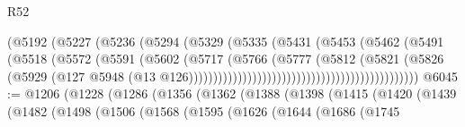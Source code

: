 \begin{lexlean}{R52}
\begin{coremodule}
{{{{{{{{{{{{{{{{{{{{{{{{{{{{{{{{{{{{{{{{{{{{{{{{{{{{{{{{{{{{{{{{{{{{{{{{{{{{{{{{{{{{{{{{{{{{{{{{{{{{{{{{{{{{{{{{{{{{{{{{{{{{{{{{{{{{{{{{{{{{{{{{{{{{{{{{{{{{{{{{{{{{{{{{{{{{{{{{{{{{{{{{{{{{{{{{{{{{{{                                                    (@5192
                                                      (@5227
                                                        (@5236
                                                          (@5294
                                                            (@5329
                                                              (@5335
                                                                (@5431
                                                                  (@5453
                                                                    (@5462
                                                                      (@5491
                                                                        (@5518
                                                                          (@5572
                                                                            (@5591
                                                                              (@5602
                                                                                (@5717
                                                                                  (@5766
                                                                                    (@5777
                                                                                      (@5812
                                                                                        (@5821
                                                                                          (@5826
                                                                                            (@5929
                                                                                              (@127
                                                                                                @5948
                                                                                                (@13
                                                                                                  @126)))))))))))))))))))))))))))))))))))))))))))))))
@6045 := @1206
    (@1228
      (@1286
        (@1356
          (@1362
            (@1388
              (@1398
                (@1415
                  (@1420
                    (@1439
                      (@1482
                        (@1498
                          (@1506
                            (@1568
                              (@1595
                                (@1626
                                  (@1644
                                    (@1686
                                      (@1745
}}}}}}}}}}}}}}}}}}}}}}}}}}}}}}}}}}}}}}}}}}}}}}}}}}}}}}}}}}}}}}}}}}}}}}}}}}}}}}}}}}}}}}}}}}}}}}}}}}}}}}}}}}}}}}}}}}}}}}}}}}}}}}}}}}}}}}}}}}}}}}}}}}}}}}}}}}}}}}}}}}}}}}}}}}}}}}}}}}}}}}}}}}}}}}}}}}}}}}
\end{coremodule}
\end{lexlean}
